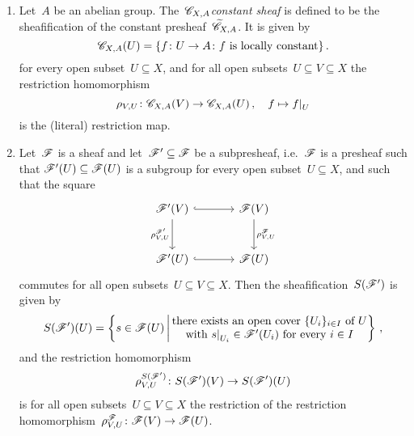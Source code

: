 \begin{example}
\begin{enumerate}
      \begin{examplenonum}[Sheafificaton]
        \leavevmode
        \begin{enumerate}
          \item
            Let~$A$ be an abelian group.
            The~$\mathscr{C}_{X,A}$\emph{constant sheaf} is defined to be the sheafification of the constant presheaf~$\widetilde{\mathscr{C}}_{X,A}$.
            It is given by
            \[
                \mathscr{C}_{X,A}(U)
              = \{
                  f \colon U \to A
                \colon
                  \text{$f$ is locally constant}
                \} \,.
            \]
            for every open subset~$U \subseteq X$, and for all open subsets~$U \subseteq V \subseteq X$ the restriction homomorphism
            \[
                      \rho_{V,U}
              \colon  \sheaf{C}_{X,A}(V)
              \to     \sheaf{C}_{X,A}(U) \,,
              \quad   f
              \mapsto \restrict{f}{U}
            \]
            is the (literal) restriction map.
          \item
            Let~$\mathscr{F}$ is a sheaf and let~$\mathscr{F}' \subseteq \mathscr{F}$ be a subpresheaf, i.e.~$\mathscr{F}$ is a presheaf such that $\mathscr{F}'(U) \subseteq \mathscr{F}(U)$ is a subgroup for every open subset~$U \subseteq X$, and such that the square
            \[
              \begin{tikzcd}[sep = large]
                  \sheaf{F}'(V)
                  \arrow[hook]{r}
                  \arrow{d}[left]{\rho^{\sheaf{F}'}_{V,U}}
                & \sheaf{F}(V)
                  \arrow{d}[right]{\rho^\sheaf{F}_{V,U}}
                \\
                  \sheaf{F}'(U)
                  \arrow[hook]{r}
                & \sheaf{F}(U)
              \end{tikzcd}
            \]
            commutes for all open subsets~$U \subseteq V \subseteq X$.
            Then the sheafification~$S(\mathscr{F}')$ is given by
            \[
                S(\sheaf{F}')(U)
              = \left\{
                  s \in \sheaf{F}(U)
                \suchthat*
                  \begin{tabular}{@{}c@{}}
                    there exists an open cover~$\{U_i\}_{i \in I}$ of~$U$ \\
                    with~$\restrict{s}{U_i} \in \sheaf{F}'(U_i)$ for every~$i\in I$
                  \end{tabular}
                \right\} \,,
            \]
            and the restriction homomorphism
            \[
                      \rho_{V,U}^{S(\mathscr{F}')}
              \colon  S(\mathscr{F}')(V)
              \to     S(\mathscr{F}')(U)
            \]
            is for all open subsets~$U \subseteq V \subseteq X$ the restriction of the restriction homomorphism~$\rho_{V,U}^{\mathscr{F}} \colon \mathscr{F}(V) \to \mathscr{F}(U)$.
        \end{enumerate}
      \end{examplenonum}
      

\end{enumerate}
\end{example}
